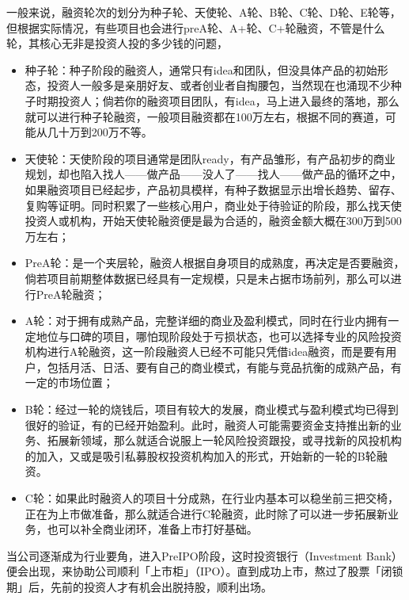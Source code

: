 \documentclass[letterpaper,11pt,english]{sphinxmanual}
\begin{document}
一般来说，融资轮次的划分为种子轮、天使轮、A轮、B轮、C轮、D轮、E轮等，但根据实际情况，有些项目也会进行preA轮、A+轮、C+轮融资，不管是什么轮，其核心无非是投资人投的多少钱的问题，
\begin{itemize}
\item {} 
种子轮：种子阶段的融资人，通常只有idea和团队，但没具体产品的初始形态，投资人一般多是亲朋好友、或者创业者自掏腰包，当然现在也涌现不少种子时期投资人；倘若你的融资项目团队，有idea，马上进入最终的落地，那么就可以进行种子轮融资，一般项目融资都在100万左右，根据不同的赛道，可能从几十万到200万不等。

\item {} 
天使轮：天使阶段的项目通常是团队ready，有产品雏形，有产品初步的商业规划，却也陷入找人——做产品——没人了——找人——做产品的循环之中，如果融资项目已经起步，产品初具模样，有种子数据显示出增长趋势、留存、复购等证明。同时积累了一些核心用户，商业处于待验证的阶段，那么找天使投资人或机构，开始天使轮融资便是最为合适的，融资金额大概在300万到500万左右；

\item {} 
PreA轮：是一个夹层轮，融资人根据自身项目的成熟度，再决定是否要融资，倘若项目前期整体数据已经具有一定规模，只是未占据市场前列，那么可以进行PreA轮融资；

\item {} 
A轮：对于拥有成熟产品，完整详细的商业及盈利模式，同时在行业内拥有一定地位与口碑的项目，哪怕现阶段处于亏损状态，也可以选择专业的风险投资机构进行A轮融资，这一阶段融资人已经不可能只凭借idea融资，而是要有用户，包括月活、日活、要有自己的商业模式，有能与竞品抗衡的成熟产品，有一定的市场位置；

\item {} 
B轮：经过一轮的烧钱后，项目有较大的发展，商业模式与盈利模式均已得到很好的验证，有的已经开始盈利。此时，融资人可能需要资金支持推出新的业务、拓展新领域，那么就适合说服上一轮风险投资跟投，或寻找新的风投机构的加入，又或是吸引私募股权投资机构加入的形式，开始新的一轮的B轮融资。

\item {} 
C轮：如果此时融资人的项目十分成熟，在行业内基本可以稳坐前三把交椅，正在为上市做准备，那么就适合进行C轮融资，此时除了可以进一步拓展新业务，也可以补全商业闭环，准备上市打好基础。

\end{itemize}

当公司逐渐成为行业要角，进入Pre\sphinxhyphen{}IPO阶段，这时投资银行（Investment
Bank）便会出现，来协助公司顺利「上市柜」（IPO）。直到成功上市，熬过了股票「闭锁期」后，先前的投资人才有机会出脱持股，顺利出场。%
\begin{footnote}[119]\sphinxAtStartFootnote
{}
%
\end{footnote}
\end{document}
